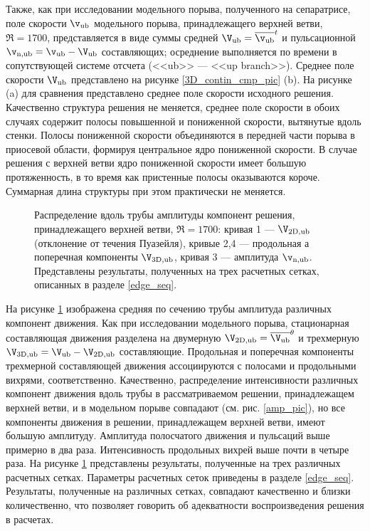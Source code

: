 Также, как при исследовании модельного порыва, полученного на сепаратрисе, поле скорости $\v_\mathrm{ub}$ модельного порыва, принадлежащего верхней ветви, $\Re = 1700$, представляется в виде суммы средней $\V_\mathrm{ub} = \overline{\v_\mathrm{ub}}^t$ и пульсационной $\v_\mathrm{n,ub} = \v_\mathrm{ub} - \V_\mathrm{ub}$ составляющих; осреднение выполняется по времени в сопутствующей системе отсчета (<<ub>> --- <<up branch>>). Среднее поле скорости $\V_\mathrm{ub}$ представлено на рисунке \ref{3D_contin_cmp_pic} (b). На рисунке (a) для сравнения представлено среднее поле скорости исходного решения. Качественно структура решения не меняется, среднее поле скорости в обоих случаях содержит полосы повышенной и пониженной скорости, вытянутые вдоль стенки. Полосы пониженной скорости объединяются в передней части порыва в приосевой области, формируя центральное ядро пониженной скорости. В случае решения с верхней ветви ядро пониженной скорости имеет большую протяженность, в то время как пристенные полосы оказываются короче. Суммарная длина структуры при этом практически не меняется. 


\begin{figure}
\caption{Распределение вдоль трубы амплитуды компонент решения, принадлежащего верхней ветви, $\Re = 1700$: кривая 1 --- $\V_\mathrm{2D,ub}$ (отклонение от течения Пуазейля), кривые 2,4 --- продольная а поперечная компоненты $\V_\mathrm{3D,ub}$, кривая 3 --- амплитуда $\v_\mathrm{n,ub}$. Представлены результаты, полученных на трех расчетных сетках, описанных в разделе \ref{edge_seq}.}
\label{amp_ub_pic}
\end{figure}


На рисунке \ref{amp_ub_pic} изображена средняя по сечению трубы амплитуда различных компонент движения. Как при исследовании модельного порыва, стационарная составляющая движения разделена на двумерную $\V_\mathrm{2D,ub} = \overline{\V_\mathrm{ub}}^{\theta}$ и трехмерную $\V_\mathrm{3D,ub} = \V_\mathrm{ub} - \V_\mathrm{2D,ub}$ составляющие. Продольная и поперечная компоненты трехмерной составляющей движения ассоциируются с полосами и продольными вихрями, соответственно. Качественно, распределение интенсивности различных компонент движения вдоль трубы в рассматриваемом решении, принадлежащем верхней ветви, и в модельном порыве совпадают (см. рис. \ref{amp_pic}), но все компоненты движения в решении, принадлежащем верхней ветви, имеют большую амплитуду. Амплитуда полосчатого движения и пульсаций выше примерно в два раза. Интенсивность продольных вихрей выше почти в четыре раза. На рисунке \ref{amp_ub_pic} представлены результаты, полученные на трех различных расчетных сетках. Параметры расчетных сеток приведены в разделе \ref{edge_seq}. Результаты, полученные на различных сетках, совпадают качественно и близки количественно, что позволяет говорить об адекватности воспроизведения решения в расчетах. 


